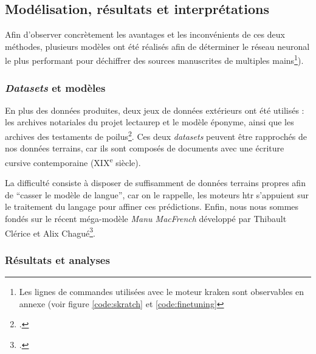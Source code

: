 	\subsection{Modélisation, résultats et interprétations}
	
	Afin d'observer concrètement les avantages et les inconvénients de ces deux méthodes, plusieurs modèles ont été réalisés afin de déterminer le réseau neuronal le plus performant pour déchiffrer des sources manuscrites de multiples mains\footnote{Les lignes de commandes utilisées avec le moteur kraken sont observables en annexe (voir figure \ref{code:skratch} et \ref{code:finetuning}}).
	
	\subsubsection{\textit{Datasets} et modèles}
	
	En plus des données produites, deux jeux de données extérieurs ont été utilisés : les archives notariales du projet \gls{lectaurep} et le modèle éponyme, ainsi que les archives des testaments de poilus\footcite{durandNotairesParisRepertoires2021, clericeCREMMAANTestamentDePoilus2022}. Ces deux \textit{datasets} peuvent être rapprochés de nos données terrains, car ils sont composés de documents avec une écriture cursive contemporaine (XIX\textsuperscript{e} siècle). 
	
	La difficulté consiste à disposer de suffisamment de données terrains propres afin de \enquote{casser le modèle de langue}, car on le rappelle, les moteurs \gls{htr} s'appuient sur le traitement du langage pour affiner ces prédictions. Enfin, nous nous sommes fondés sur le récent méga-modèle \textit{Manu MacFrench} développé par Thibault Clérice et Alix Chagué\footcite{chagueHTRUnitedManuMcFrench2022}.
	
	
	\subsubsection{Résultats et analyses}
	
